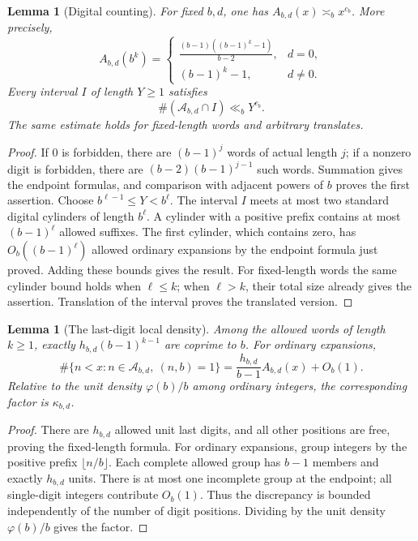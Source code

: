 \documentclass[11pt,a4paper]{article}
\theoremstyle{paperplain}
\newtheorem{lemma}[theorem]{Lemma}
\numberwithin{equation}{section}
\begin{document}
\begin{lemma}[Digital counting]\label{prelim:count}
For fixed $b,d$, one has $A_{b,d}(x)\asymp_b x^{c_b}$. More precisely,
\[
 A_{b,d}(b^k)=
 \begin{cases}
 \displaystyle\frac{(b-1)((b-1)^k-1)}{b-2},&d=0,\\[3pt]
 (b-1)^k-1,&d\ne0.
 \end{cases}
\]
Every interval $I$ of length $Y\geqslant1$ satisfies
\begin{equation}\label{prelim:interval}
 \#(\mathscr A_{b,d}\cap I)\ll_b Y^{c_b}.
\end{equation}
The same estimate holds for fixed-length words and arbitrary translates.
\end{lemma}
\begin{proof}
If $0$ is forbidden, there are $(b-1)^j$ words of actual length $j$; if a
nonzero digit is forbidden, there are $(b-2)(b-1)^{j-1}$ such words.
Summation gives the endpoint formulas, and comparison with adjacent powers
of $b$ proves the first assertion. Choose
$b^{\ell-1}\leqslant Y<b^\ell$. The interval $I$ meets at most two standard
digital cylinders of length $b^\ell$. A cylinder with a positive prefix
contains at most $(b-1)^\ell$ allowed suffixes. The first cylinder, which
contains zero, has $O_b((b-1)^\ell)$ allowed ordinary expansions by the
endpoint formula just proved. Adding these bounds gives the result.
For fixed-length words the same cylinder bound holds when $\ell\leqslant k$;
when $\ell>k$, their total size already gives the assertion. Translation
of the interval proves the translated version.
\end{proof}

\begin{lemma}[The last-digit local density]\label{prelim:local}
Among the allowed words of length $k\geqslant1$, exactly
$h_{b,d}(b-1)^{k-1}$ are coprime to $b$. For ordinary expansions,
\[
 \#\{n<x:n\in\mathscr A_{b,d},\ (n,b)=1\}
   =\frac{h_{b,d}}{b-1}A_{b,d}(x)+O_b(1).
\]
Relative to the unit density $\varphi(b)/b$ among ordinary integers,
the corresponding factor is $\kappa_{b,d}$.
\end{lemma}
\begin{proof}
There are $h_{b,d}$ allowed unit last digits, and all other positions are
free, proving the fixed-length formula. For ordinary expansions, group
integers by the positive prefix $\lfloor n/b\rfloor$. Each complete allowed
group has $b-1$ members and exactly $h_{b,d}$ units. There is at most one
incomplete group at the endpoint; all single-digit integers contribute
$O_b(1)$. Thus the discrepancy is bounded independently of the number of
digit positions. Dividing by the unit density $\varphi(b)/b$ gives the factor.
\end{proof}
\end{document}
